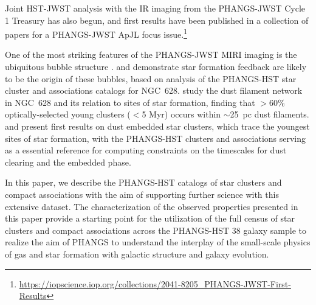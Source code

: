 \documentclass[linenumbers]{aastex63}
\begin{document}
Joint HST-JWST analysis with the IR imaging from the PHANGS-JWST Cycle 1 Treasury has also begun, and first results have been published in a collection of papers for a PHANGS-JWST ApJL focus issue.\footnote{\url{https://iopscience.iop.org/collections/2041-8205_PHANGS-JWST-First-Results}}  

One of the most striking features of the PHANGS-JWST MIRI imaging is the ubiquitous bubble structure \citep{lee_phangs-jwst_2023, williams_phangs-jwst_2024}. \citet{watkins_phangs-jwst_2023} and \citet{barnes_phangs-jwst_2023} demonstrate star formation feedback are likely to be the origin of these bubbles, based on analysis of the PHANGS-HST star cluster and associations catalogs for NGC~628.  \citet{thilker_phangs-jwst_2023} study the dust filament network in NGC~628 and its relation to sites of star formation, finding that $>$60\% optically-selected young clusters ($<$5 Myr) occurs within $\sim$25~pc dust filaments. \citet{rodriguez_phangs-jwst_2023} and \citet{whitmore_phangs-jwst_2023} present first results on dust embedded star clusters, which trace the youngest sites of star formation, with the PHANGS-HST clusters and associations serving as a essential reference for computing constraints on the timescales for dust clearing and the embedded phase.


In this paper, we describe the PHANGS-HST catalogs of star clusters and compact associations with the aim of supporting further science with this extensive dataset.  The characterization of the observed properties presented in this paper provide a starting point for the utilization of the full census of star clusters and compact associations across the PHANGS-HST 38 galaxy sample to realize the aim of PHANGS to understand the interplay of the small-scale physics of gas and star formation with galactic structure and galaxy evolution.
\end{document}
